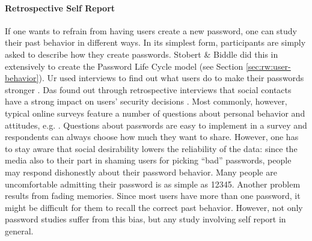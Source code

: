 \paragraph{Retrospective Self Report}
If one wants to refrain from having users create a new password, one can study their past behavior in different ways. In its simplest form, participants are simply asked to describe how they create passwords. Stobert \& Biddle did this in extensively to create the Password Life Cycle model \cite{Stobert2014PasswordLifeCycle} (see Section \ref{sec:rw:user-behavior}). Ur \etal used interviews to find out what users do to make their passwords stronger \cite{Ur2015PWCreationLab}. Das \etal found out through retrospective interviews that social contacts have a strong impact on users' security decisions \cite{Das2014EffectSocialInfluenceSecuritySensitivity}. Most commonly, however, typical online surveys feature a number of questions about personal behavior and attitudes, e.g. \cite{Adams1997MakingPWsSecureAndUsable, Gaw2006PasswordManagement, Kuo2006HumanSelectionMnemonic,Riley2006WhatUsersKnowWhatTheyDo, Shay2010EncounteringPasswordRequirements}. Questions about passwords are easy to implement in a survey and respondents can always choose how much they want to share. However, one has to stay aware that social desirability lowers the reliability of the data: since the media also to their part in shaming users for picking ``bad'' passwords, people may respond dishonestly about their password behavior. Many people are uncomfortable admitting their password is as simple as 12345. Another problem results from fading memories. Since most users have more than one password, it might be difficult for them to recall the correct past behavior. However, not only password studies suffer from this bias, but any study involving self report in general. 


%
%
%


